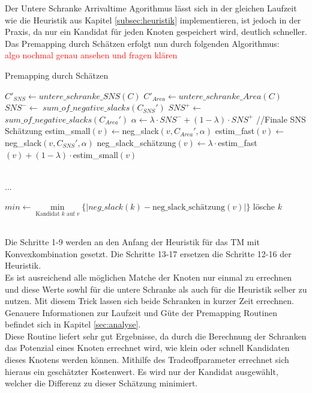 \documentclass[11pt, a4paper, german]{article}
\begin{document}
Der Untere Schranke Arrivaltime Agorithmus lässt sich in der gleichen Laufzeit wie die Heuristik aus Kapitel \ref{subsec:heuristik} implementieren, ist jedoch in der Praxis, da nur ein Kandidat für jeden Knoten gespeichert wird, deutlich schneller.\\

 Das Premapping durch Schätzen erfolgt nun durch folgenden Algorithmus:\\
\textcolor{red}{algo nochmal genau ansehen und fragen klären} 
 
\begin{algorithm}[H]
 \LinesNumbered
 \DontPrintSemicolon
 \caption{Premapping durch Schätzen}
 $C'_{SNS} \gets untere\_schranke\_SNS(C)$\;
$C'_{Area} \gets untere\_schranke\_Area(C)$\; 
 $SNS^- \gets $ $sum\_of\_negative\_slacks(C_{SNS}')$\;
 $SNS^+ \gets $ $sum\_of\_negative\_slacks(C_{Area}')$\;
 $\alpha \gets \lambda \cdot SNS^- + (1-\lambda)\cdot SNS^+$ //Finale SNS Sch\"atzung \;
 {
  estim\_small$(v) \gets $neg\_slack$(v,C_{Area}',\alpha)$\;
  estim\_fast$(v) \gets $neg\_slack$(v,C_{SNS}',\alpha)$\;
  neg\_slack\_sch\"atzung$(v) \gets \lambda \cdot $estim\_fast$(v) + (1-\lambda)\cdot$estim\_small$(v)$\;
 }
 
\ \\...\\ \;
 
  {
    $min \gets \min\limits_{\text{Kandidat }k\text{ auf }v}\{|neg\_slack(k)-\text{neg\_slack\_sch\"atzung}(v)|\}$\;
    {
      {
	l\"osche $k$\;
      }
    }
   }
\end{algorithm}\ \\
 
Die Schritte 1-9 werden an den Anfang der Heuristik für das TM mit Konvexkombination gesetzt. Die Schritte 13-17 ersetzen die Schritte 12-16 der Heuristik.\\ 
Es ist ausreichend alle möglichen Matche der Knoten nur einmal zu errechnen und diese Werte sowhl für die untere Schranke als auch für die Heuristik selber zu nutzen. Mit diesem Trick lassen sich beide Schranken in kurzer Zeit errechnen. Genauere Informationen zur Laufzeit und Güte der Premapping Routinen befindet sich in Kapitel \ref{sec:analyse}.\\
Diese Routine liefert sehr gut Ergebnisse, da durch die Berechnung der Schranken das Potenzial eines Knoten errechnet wird, wie klein oder schnell Kandidaten dieses Knotens werden können. Mithilfe des Tradeoffparameter errechnet sich hieraus ein geschätzter Kostenwert. Es wird nur der Kandidat ausgewählt, welcher die Differenz zu dieser Schätzung minimiert.
\end{document}
